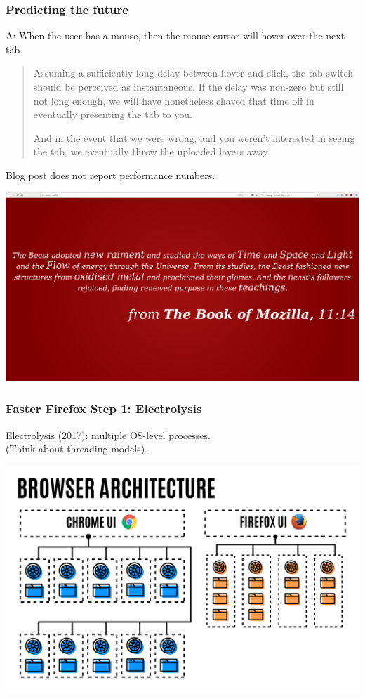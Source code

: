 \begin{frame}
\frametitle{Predicting the future}
\large

A: When the user has a mouse, then the mouse cursor will hover over the next tab.

\vspace*{1em}
\begin{quote}
Assuming a sufficiently long delay between hover and click, the tab switch should be perceived as instantaneous. If the delay was non-zero but still not long enough, we will have nonetheless shaved that time off in eventually presenting the tab to you.

And in the event that we were wrong, and you weren’t interested in seeing the tab, we eventually throw the uploaded layers away.
\end{quote}

Blog post does not report performance numbers.
\end{frame}

\begin{frame}
\begin{center}
\includegraphics[width=\textwidth]{images/L19-about-mozilla.png}
\end{center}
\end{frame}

\begin{frame}
\frametitle{Faster Firefox Step 1: Electrolysis}

\Large
Electrolysis (2017): multiple OS-level processes.\\
(Think about threading models).

\begin{center}
\includegraphics[width=.9\textwidth]{images/L19-chrome-vs-firefox.png}
\end{center}
\end{frame}

